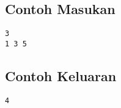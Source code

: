 \documentclass{article}
\begin{document}
\begin{multicols}{2}
\subsection*{Contoh Masukan}
\begin{lstlisting}
3
1 3 5
\end{lstlisting}
\columnbreak
\subsection*{Contoh Keluaran}
\begin{lstlisting}
4
\end{lstlisting}
\vfill
\null
\end{multicols}


\pagebreak
\end{document}
